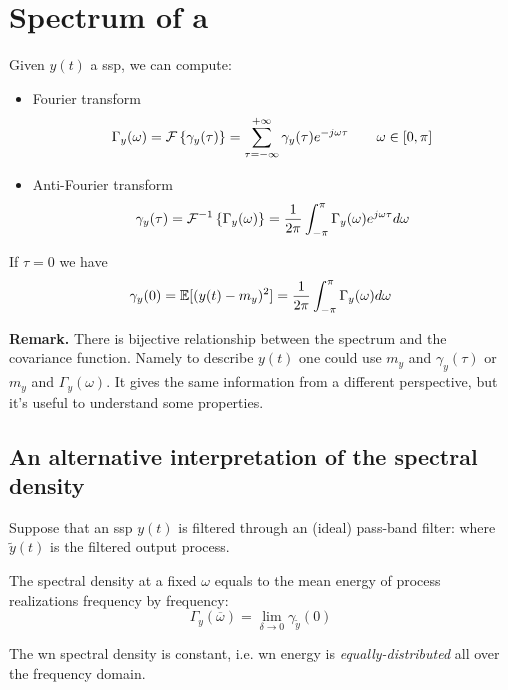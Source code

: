 \section{Spectrum of a }
Given $y(t)$ a \gls{ssp}, we can compute:
\begin{itemize}
	\item Fourier transform
	\[
		\Gamma _{y}(\omega)=\mathcal{F}\left\{\gamma _{y}(\tau )\right\}=\sum_{\tau =-\infty }^{+\infty} \gamma _{y}(\tau ) e^{-j\omega \tau } \qquad \omega \in [0,\pi ]
	\]
	\item Anti-Fourier transform
	\[
		\gamma _{y}(\tau)=\mathcal{F}^{-1}\left\{\Gamma _{y}(\omega)\right\}=\frac{1}{2\pi }\int_{-\pi }^{\pi } \Gamma _{y}(\omega )e^{j\omega \tau }d\omega  
	\]
\end{itemize}

\begin{rem}
If $\tau =0$ we have
\[
	\gamma _{y}(0)=\mathbb{E}[(y(t)-m_{y})^2 ]=\frac{1}{2\pi }\int_{-\pi }^{\pi } \Gamma _{y}(\omega )d\omega 
\]
\end{rem}
\textbf{Remark.}
There is bijective relationship between the spectrum and the covariance function. Namely to describe $y(t)$ one could use $m_{y}$ and $\gamma _{y}(\tau )$ or $m_{y}$ and $\Gamma _{y}(\omega)$. It gives the same information from a different perspective, but it's useful to understand some properties.

\subsection{An alternative interpretation of the spectral density}
Suppose that an \gls{ssp} $y(t)$ is filtered through an (ideal) pass-band filter:
where $\tilde{y}(t)$ is the filtered output process.
\begin{thm}
	The spectral density at a fixed $\omega$ equals to the mean energy of process realizations frequency by frequency:
	\[
		\Gamma _{y}(\overline{\omega})=\lim_{\delta  \to 0} \gamma _{\tilde{y}}(0)
	\]
\end{thm}

\begin{exa}
The \gls{wn} spectral density is constant, i.e. \gls{wn} energy is \emph{equally-distributed} all over the frequency domain.
\end{exa}

